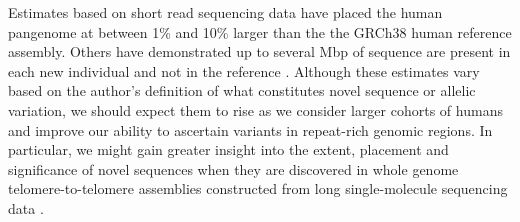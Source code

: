 Estimates based on short read sequencing data have placed the human pangenome at between 1\% \cite{li2010building} and 10\% \cite{sherman2019assembly} larger than the the GRCh38 human reference assembly.
Others have demonstrated up to several Mbp of sequence are present in each new individual and not in the reference \cite{li2010building,Hehir-Kwa2016-hb,Steinberg_2016,Audano_2019}.
Although these estimates vary based on the author's definition of what constitutes novel sequence or allelic variation, we should expect them to rise as we consider larger cohorts of humans and improve our ability to ascertain variants in repeat-rich genomic regions.
In particular, we might gain greater insight into the extent, placement and significance of novel sequences when they are discovered in whole genome telomere-to-telomere assemblies constructed from long single-molecule sequencing data \cite{miga2019telomere,Langley_2019}.





